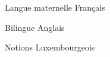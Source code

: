 

\begin{cventries}

  \cventry
  {Langue maternelle} %
  {Français} %
  {} %
  {} %
  {}

  \cventry
  {Bilingue} %
  {Anglais} %
  {} %
  {} %
  {}

  \cventry
  {Notions} %
  {Luxembourgeois} %
  {} %
  {} %
  {}

\end{cventries}

